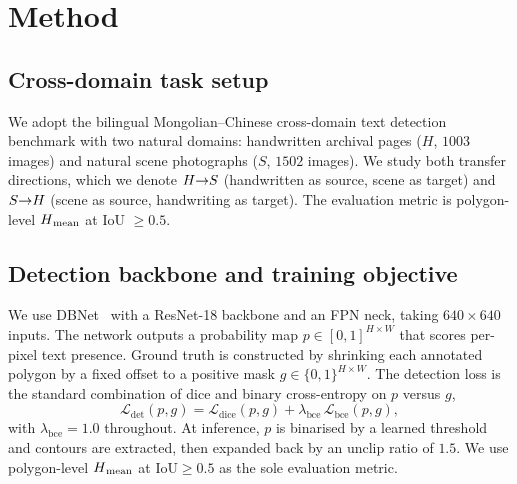 \section{Method}
\label{sec:method}

\subsection{Cross-domain task setup}
We adopt the bilingual Mongolian--Chinese cross-domain text detection
benchmark with two natural domains: handwritten archival pages
($H$, $1003$ images) and natural scene photographs ($S$, $1502$ images).
We study both transfer directions, which we denote $H{\rightarrow}S$
(handwritten as source, scene as target) and $S{\rightarrow}H$ (scene as source,
handwriting as target). The evaluation metric is polygon-level
$H\textsubscript{mean}$ at IoU $\geq 0.5$.

\subsection{Detection backbone and training objective}
\label{sec:method:backbone}
We use DBNet~\cite{liao2020real} with a ResNet-18 backbone and an FPN
neck, taking $640 \times 640$ inputs. The network outputs a probability
map $p \in [0,1]^{H \times W}$ that scores per-pixel text presence. Ground
truth is constructed by shrinking each annotated polygon by a fixed offset
to a positive mask $g \in \{0,1\}^{H \times W}$. The detection loss is the
standard combination of dice and binary cross-entropy on $p$ versus $g$,
\begin{equation}
  \mathcal{L}_{\mathrm{det}}(p,g)
    = \mathcal{L}_{\mathrm{dice}}(p,g)
    + \lambda_{\mathrm{bce}}\,\mathcal{L}_{\mathrm{bce}}(p,g),
  \label{eq:det}
\end{equation}
with $\lambda_{\mathrm{bce}}=1.0$ throughout. At inference, $p$ is
binarised by a learned threshold and contours are extracted, then expanded
back by an unclip ratio of $1.5$. We use polygon-level $H\textsubscript{mean}$ at
$\mathrm{IoU}\ge 0.5$ as the sole evaluation metric.

